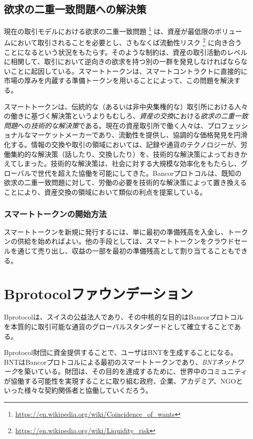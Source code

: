 \documentclass{jsarticle}
\begin{document}
  \subsection{欲求の二重一致問題への解決策}

    現在の取引モデルにおける欲求の二重一致問題
    \footnote{\url{https://en.wikipedia.org/wiki/Coincidence_of_wants}}
    は、資産が最低限のボリュームにおいて取引されることを必要とし、さもなくば流動性リスク
    \footnote{\url{https://en.wikipedia.org/wiki/Liquidity_risk}} 
    に向き合うことになるという状況をもたらす。そのような制約は、資産の取引活動のレベルに相関して、取引において逆向きの欲求を持つ別の一群を発見しなければならないことに起因している。スマートトークンは、スマートコントラクトに直接的に市場の厚みを内蔵する準備トークンを用いることによって、この問題を解決する。

    スマートトークンは、伝統的な（あるいは非中央集権的な）取引所における人々の働きに基づく解決策というよりもむしろ、\emph{資産の交換}における\emph{欲求の二重一致問題}への\emph{技術的な解決策}である。現在の資産取引所で働く人々は、プロフェッショナルなマーケットメーカーであり、流動性を提供し、協調的な価格発見を円滑化する。情報の交換や取引の領域においては、記録や通貨のテクノロジーが、労働集約的な解決策（話したり、交換したり）を、技術的な解決策によっておきかえてしまった。技術的な解決策は、社会に対する大規模な効率化をもたらし、グローバルで世代を超えた協働を可能にしてきた。Bancorプロトコルは、既知の欲求の二重一致問題に対して、労働の必要を技術的な解決策によって置き換えることにより、資産交換の領域において類似の利点を提案している。

    \subsubsection{スマートトークンの開始方法}

    スマートトークンを新規に発行するには、単に最初の準備残高を入金し、トークンの供給を始めればよい。他の手段としては、スマートトークンをクラウドセールを通じて売り出し、収益の一部を最初の準備残高として割り当てることもできる。

\section{Bprotocolファウンデーション}

Bprotocolは、スイスの公益法人であり、その中核的な目的はBancorプロトコルを本質的に取引可能な通貨のグローバルスタンダードとして確立することである。

Bprotocol財団に資金提供することで、ユーザはBNTを生成することになる。BNTはBancorプロトコルによる最初のスマートトークンであり、\emph{BNTネットワーク}を築いている。財団は、その目的を達成するために、世界中のコミュニティが協働する可能性を実現することに取り組む政府、企業、アカデミア、NGOといった様々な契約関係者と協働していくだろう。
\end{document}
